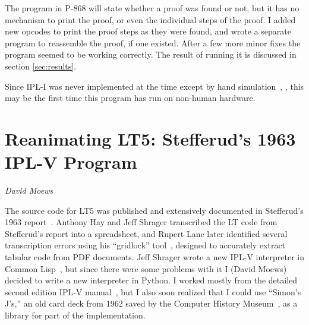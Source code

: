 \documentclass[journal]{IEEEtran}
\begin{document}
The program in P-868 will state whether a proof was found or not,
but it has no mechanism to print the proof, or even the individual
steps of the proof.  I added new opcodes to print the proof steps
as they were found, and wrote a separate program to reassemble the 
proof, if one existed.  After a few more minor fixes the program seemed 
to be working correctly.  The result of running it is discussed in section
\ref{sec:results}.

Since IPL-I was never implemented at the time except by hand
simulation~\cite[Ch.~13]{simon1996models}, \cite[p.~xx]{newell1964ipl}, this may
be the first time this program has run on non-human hardware.


%
%

\section{Reanimating LT5: Stefferud's 1963 IPL-V Program}
\label{sec:lt5}

{\em David Moews}

%
%

The source code for LT5 was published and extensively documented
in Stefferud's 1963 report~\cite{stefferud1963lt}.  
Anthony Hay and Jeff Shrager transcribed the LT code from Stefferud's
report into a spreadsheet, and Rupert Lane later identified
several transcription errors using his ``gridlock''
tool~\cite{lane2024gridlock}, designed to accurately extract
tabular code from PDF documents.
Jeff Shrager wrote a new IPL-V interpreter in Common 
Lisp~\cite{shrager2026,shragerrepo}, but since there were some problems with
it I (David Moews) decided to write a new interpreter in Python.
I worked mostly from the detailed second edition IPL-V
manual~\cite{newell1964ipl}, but I also soon realized that I could use
``Simon's J's,'' an old card deck from 1962 saved by the Computer History
Museum~\cite{bochannek2012simonsjs}, as a library for part of the
implementation.
\end{document}
